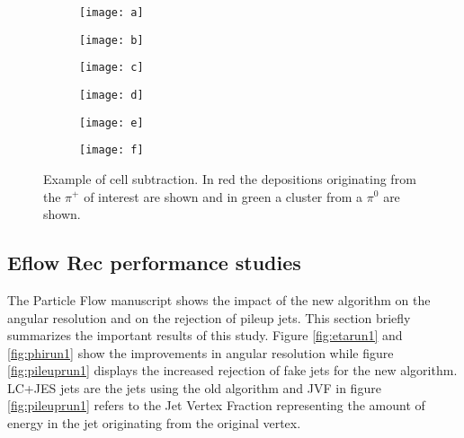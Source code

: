 \begin{figure}[htbp]
  \centering
  \begin{subfigure}[b]{0.3\figwidth}
    \texttt{[image: a]}
    \caption{}\label{fig:sub-a}
  \end{subfigure}
  \begin{subfigure}[b]{0.3\figwidth}
    \texttt{[image: b]}
    \caption{}\label{fig:sub-b}
  \end{subfigure}
  \begin{subfigure}[b]{0.3\figwidth}
    \texttt{[image: c]}
    \caption{}\label{fig:sub-c}
  \end{subfigure}
  \begin{subfigure}[b]{0.3\figwidth}
    \texttt{[image: d]}
    \caption{}\label{fig:sub-d}
  \end{subfigure}
    
    
  \begin{subfigure}[b]{0.3\figwidth}
        \texttt{[image: e]}
        \caption{}\label{fig:sub-e}
  \end{subfigure}
  \begin{subfigure}[b]{0.3\figwidth}
        \texttt{[image: f]}
        \caption{}\label{fig:sub-f}
  \end{subfigure}
  \caption{Example of cell subtraction. In red the depositions originating from the $\pi ^+$ of interest are shown and in green a cluster from a $\pi ^0$ are shown. \cite{pflow16}}
  \label{fig:sub}
\end{figure}


\subsection{Eflow Rec performance studies}

The Particle Flow manuscript shows the impact of the new algorithm on the angular resolution and on the rejection of pileup jets. This section briefly summarizes the important results of this study. Figure \ref{fig:etarun1} and \ref{fig:phirun1} show the improvements in angular resolution while figure \ref{fig:pileuprun1} displays the increased rejection of fake jets for the new algorithm. LC+JES jets are the jets using the old algorithm and JVF in figure \ref{fig:pileuprun1} refers to the Jet Vertex Fraction representing the amount of energy in the jet originating from the original vertex.

